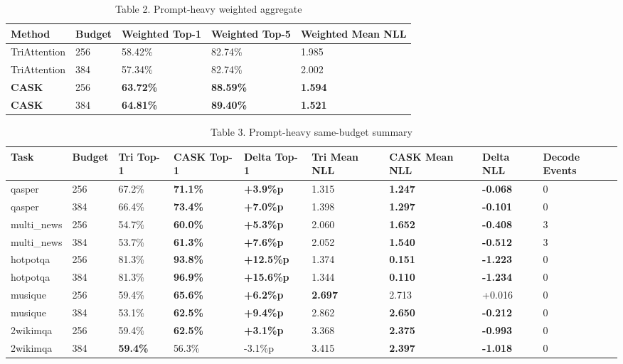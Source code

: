 \begin{table}[H]
\centering
\small
\caption{Table 2. Prompt-heavy weighted aggregate}
\begin{tabularx}{\textwidth}{YYYYY}
\toprule
Method & Budget & Weighted Top-1 & Weighted Top-5 & Weighted Mean NLL \\
\midrule
TriAttention & 256 & 58.42\% & 82.74\% & 1.985 \\
TriAttention & 384 & 57.34\% & 82.74\% & 2.002 \\
\textbf{CASK} & 256 & \textbf{63.72\%} & \textbf{88.59\%} & \textbf{1.594} \\
\textbf{CASK} & 384 & \textbf{64.81\%} & \textbf{89.40\%} & \textbf{1.521} \\
\bottomrule
\end{tabularx}
\end{table}



\begin{table}[H]
\centering
\small
\caption{Table 3. Prompt-heavy same-budget summary}
\begin{tabularx}{\textwidth}{YYYYYYYYY}
\toprule
Task & Budget & Tri Top-1 & CASK Top-1 & Delta Top-1 & Tri Mean NLL & CASK Mean NLL & Delta NLL & Decode Events \\
\midrule
qasper & 256 & 67.2\% & \textbf{71.1\%} & \textbf{+3.9\%p} & 1.315 & \textbf{1.247} & \textbf{-0.068} & 0 \\
qasper & 384 & 66.4\% & \textbf{73.4\%} & \textbf{+7.0\%p} & 1.398 & \textbf{1.297} & \textbf{-0.101} & 0 \\
multi\_news & 256 & 54.7\% & \textbf{60.0\%} & \textbf{+5.3\%p} & 2.060 & \textbf{1.652} & \textbf{-0.408} & 3 \\
multi\_news & 384 & 53.7\% & \textbf{61.3\%} & \textbf{+7.6\%p} & 2.052 & \textbf{1.540} & \textbf{-0.512} & 3 \\
hotpotqa & 256 & 81.3\% & \textbf{93.8\%} & \textbf{+12.5\%p} & 1.374 & \textbf{0.151} & \textbf{-1.223} & 0 \\
hotpotqa & 384 & 81.3\% & \textbf{96.9\%} & \textbf{+15.6\%p} & 1.344 & \textbf{0.110} & \textbf{-1.234} & 0 \\
musique & 256 & 59.4\% & \textbf{65.6\%} & \textbf{+6.2\%p} & \textbf{2.697} & 2.713 & +0.016 & 0 \\
musique & 384 & 53.1\% & \textbf{62.5\%} & \textbf{+9.4\%p} & 2.862 & \textbf{2.650} & \textbf{-0.212} & 0 \\
2wikimqa & 256 & 59.4\% & \textbf{62.5\%} & \textbf{+3.1\%p} & 3.368 & \textbf{2.375} & \textbf{-0.993} & 0 \\
2wikimqa & 384 & \textbf{59.4\%} & 56.3\% & -3.1\%p & 3.415 & \textbf{2.397} & \textbf{-1.018} & 0 \\
\bottomrule
\end{tabularx}
\end{table}


